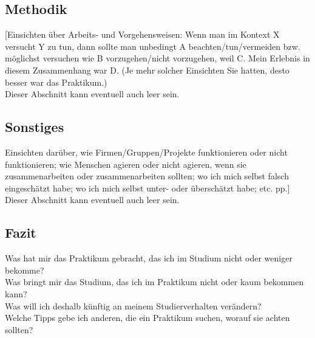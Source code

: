 \documentclass[pdftex,12pt,a4paper]{scrreprt}
\begin{document}
\subsection{Methodik}
[Einsichten über Arbeits- und Vorgehensweisen: Wenn man im Kontext X versucht Y zu
tun, dann sollte man unbedingt A beachten/tun/vermeiden bzw. möglichst versuchen wie
B vorzugehen/nicht vorzugehen, weil C. Mein Erlebnis in diesem Zusammenhang war D.
(Je mehr solcher Einsichten Sie hatten, desto besser war das Praktikum.)\\
Dieser Abschnitt kann eventuell auch leer sein.

\subsection{Sonstiges}
Einsichten darüber, wie Firmen/Gruppen/Projekte funktionieren oder nicht funktionieren;
wie Menschen agieren oder nicht agieren, wenn sie zusammenarbeiten oder
zusammenarbeiten sollten; wo ich mich selbst falsch eingeschätzt habe; wo ich mich
selbst unter- oder überschätzt habe; etc. pp.]\\
Dieser Abschnitt kann eventuell auch leer sein.

\subsection{Fazit}
Was hat mir das Praktikum gebracht, das ich im Studium nicht oder weniger bekomme?\\
Was bringt mir das Studium, das ich im Praktikum nicht oder kaum bekommen kann?\\
Was will ich deshalb künftig an meinem Studierverhalten verändern?\\
Welche Tipps gebe ich anderen, die ein Praktikum suchen, worauf sie achten sollten?\\
\end{document}
